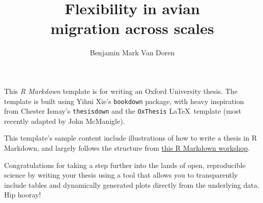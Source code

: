 \documentclass[a4paper, twoside]{templates/ociamthesis}
\title{Flexibility in avian\\
migration across scales}
\author{Benjamin Mark Van Doren}
\begin{document}
\setlength{\textbaselineskip}{22pt plus2pt}

\setlength{\frontmatterbaselineskip}{17pt plus1pt minus1pt}

\setlength{\abstractseparatelineskip}{13pt plus1pt minus1pt}
\setlength{\abstractseparateparskip}{0pt plus 1pt}

\setlength{\parskip}{2pt plus 1pt}


\setlength{\baselineskip}{\textbaselineskip}



\setcounter{secnumdepth}{2}
\setcounter{tocdepth}{0}


\begin{abstractseparate}
  This \emph{R Markdown} template is for writing an Oxford University thesis. The template is built using Yihui Xie's \texttt{bookdown} package, with heavy inspiration from Chester Ismay's \texttt{thesisdown} and the \texttt{OxThesis} \LaTeX~template (most recently adapted by John McManigle).
  
  This template's sample content include illustrations of how to write a thesis in R Markdown, and largely follows the structure from \href{https://ulyngs.github.io/rmarkdown-workshop-2019/}{this R Markdown workshop}.
  
  Congratulations for taking a step further into the lands of open, reproducible science by writing your thesis using a tool that allows you to transparently include tables and dynamically generated plots directly from the underlying data. Hip hooray!
\end{abstractseparate}
\end{document}
